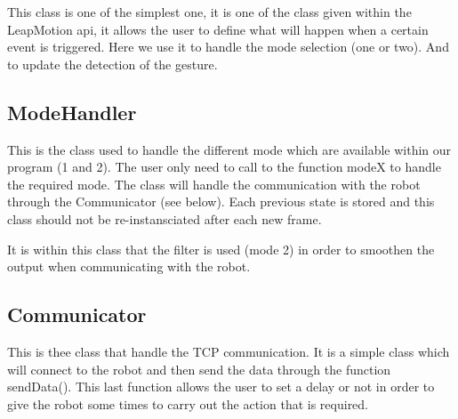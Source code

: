 This class is one of the simplest one, it is one of the class given within the LeapMotion api, it allows the user to define what will happen when a certain event is triggered.
Here we use it to handle the mode selection (one or two). And to update the detection of the gesture.

\subsection{ModeHandler}

This is the class used to handle the different mode which are available within our program (1 and 2). The user only need to call to the function modeX to handle the required mode. The class will handle the communication with the robot through the Communicator (see below). Each previous state is stored and this class should not be re-instansciated after each new frame.

It is within this class that the filter is used (mode 2) in order to smoothen the output when communicating with the robot.

\subsection{Communicator}

This is thee class that handle the TCP communication. It is a simple class which will connect to the robot and then send the data through the function sendData(). This last function allows the user to set a delay or not in order to give the robot some times to carry out the action that is required.
